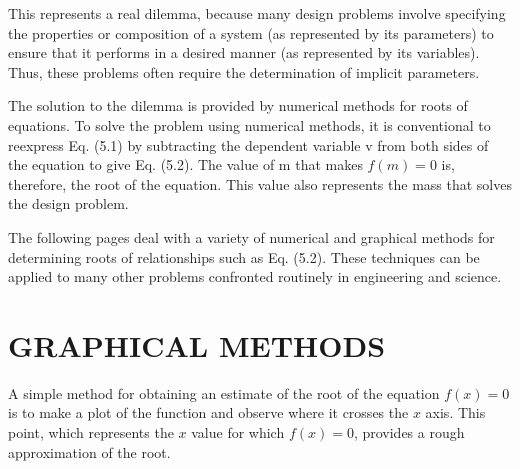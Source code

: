 \documentclass[../main.tex]{subfiles}
\begin{document}
This represents a real dilemma, because many design problems involve specifying the
properties or composition of a system (as represented by its parameters) to ensure that it
performs in a desired manner (as represented by its variables). Thus, these problems often
require the determination of implicit parameters.

The solution to the dilemma is provided by numerical methods for roots of equations.
To solve the problem using numerical methods, it is conventional to reexpress Eq. (5.1) by
subtracting the dependent variable v from both sides of the equation to give Eq. (5.2). The
value of m that makes $f (m) = 0$ is, therefore, the root of the equation. This value also represents
the mass that solves the design problem.

The following pages deal with a variety of numerical and graphical methods for determining
roots of relationships such as Eq. (5.2). These techniques can be applied to many
other problems confronted routinely in engineering and science.\\

\section[GRAPHICAL METHODS]{GRAPHICAL METHODS}
\noindent A simple method for obtaining an estimate of the root of the equation $f(x) = 0$ is to make
a plot of the function and observe where it crosses the $x$ axis. This point, which represents
the $x$ value for which $f(x) = 0$, provides a rough approximation of the root.\\
\end{document}
